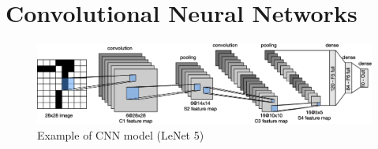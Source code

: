 \chapter{Convolutional Neural Networks}\label{ch:cnn}

\begin{figure}[H]
    \centering
    \includegraphics[width=\columnwidth]{images/cnn/lenet.eps}
    \caption{Example of CNN model (LeNet 5)~\cite{CNN}}
    \label{fig:cnn}
\end{figure}
